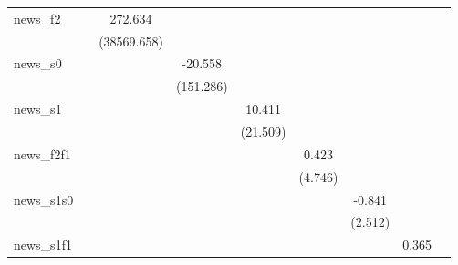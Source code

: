 {\begin{tabular}{l*{8}{c}}
\addlinespace
news\_f2     &                     &     272.634         &                     &                     &                     &                     &                     &                     \\
            &                     & (38569.658)         &                     &                     &                     &                     &                     &                     \\
\addlinespace
news\_s0     &                     &                     &     -20.558         &                     &                     &                     &                     &                     \\
            &                     &                     &   (151.286)         &                     &                     &                     &                     &                     \\
\addlinespace
news\_s1     &                     &                     &                     &      10.411         &                     &                     &                     &                     \\
            &                     &                     &                     &    (21.509)         &                     &                     &                     &                     \\
\addlinespace
news\_f2f1   &                     &                     &                     &                     &       0.423         &                     &                     &                     \\
            &                     &                     &                     &                     &     (4.746)         &                     &                     &                     \\
\addlinespace
news\_s1s0   &                     &                     &                     &                     &                     &      -0.841         &                     &                     \\
            &                     &                     &                     &                     &                     &     (2.512)         &                     &                     \\
\addlinespace
news\_s1f1   &                     &                     &                     &                     &                     &                     &       0.365         &                     \\

\end{tabular}}
